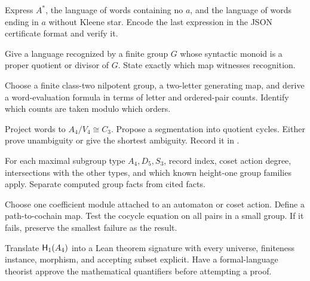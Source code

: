 \documentclass{amsart}
\begin{document}
\begin{exercise}
Express $A^\ast$, the language of words containing no $a$, and the language of words ending in $a$ without Kleene star.  Encode the last expression in the JSON certificate format and verify it.
\end{exercise}

\begin{exercise}
Give a language recognized by a finite group $G$ whose syntactic monoid is a proper quotient or divisor of $G$.  State exactly which map witnesses recognition.
\end{exercise}

\begin{exercise}
Choose a finite class-two nilpotent group, a two-letter generating map, and derive a word-evaluation formula in terms of letter and ordered-pair counts.  Identify which counts are taken modulo which orders.
\end{exercise}

\begin{exercise}[$A_4$ parser]
Project words to $A_4/V_4\cong C_3$.  Propose a segmentation into quotient cycles.  Either prove unambiguity or give the shortest ambiguity.  Record it in .
\end{exercise}

\begin{exercise}
For each maximal subgroup type $A_4,D_5,S_3$, record index, coset action degree, intersections with the other types, and which known height-one group families apply.  Separate computed group facts from cited facts.
\end{exercise}

\begin{exercise}
Choose one coefficient module attached to an automaton or coset action.  Define a path-to-cochain map.  Test the cocycle equation on all pairs in a small group.  If it fails, preserve the smallest failure as the result.
\end{exercise}

\begin{exercise}
Translate $\mathsf{H}_{1}(A_4)$ into a Lean theorem signature with every universe, finiteness instance, morphism, and accepting subset explicit.  Have a formal-language theorist approve the mathematical quantifiers before attempting a proof.
\end{exercise}
\end{document}
